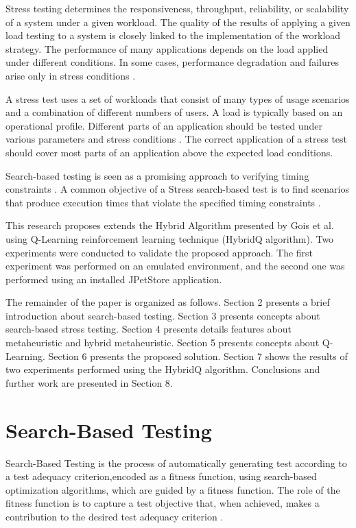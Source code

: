 Stress testing determines the responsiveness, throughput, reliability, or scalability of a system under a given workload. The quality of the results of applying a given load testing to a system is closely linked to the implementation of the workload strategy. The performance of many applications depends on the load applied under different conditions. In some cases, performance degradation and failures arise only in stress conditions \cite{Garousi2010} \cite{Jiang2010}.


A stress test uses a set of workloads that consist of many types of usage scenarios and a combination of different numbers of users. A load is typically based on an operational profile. Different parts of an application should be tested under various parameters and stress conditions \cite{Babbar2011}. The correct application of a stress test should cover most parts of an application above the expected load conditions\cite{Draheim2006b}.

Search-based testing is seen as a promising approach to verifying timing constraints \cite{Afzal2009a}. A common objective of a Stress search-based test is to find  scenarios that produce execution times that violate the specified timing constraints \cite{Sullivan}. 


This research proposes extends the Hybrid Algorithm presented by Gois et al. \cite{Gois2016} using Q-Learning reinforcement learning technique (HybridQ algorithm).  Two experiments were conducted to validate the proposed approach. The first experiment was performed on an emulated environment, and the second one was performed using an installed JPetStore application.

The remainder of the paper is organized as follows. Section 2 presents a brief introduction about search-based testing. Section 3 presents concepts about  search-based stress testing. Section 4 presents details features about metaheuristic and hybrid metaheuristic. Section 5 presents concepts about Q-Learning. Section 6 presents the proposed solution. Section 7 shows the results of two experiments performed using the HybridQ algorithm.  Conclusions and further work are presented in Section 8.



\section{Search-Based Testing}

Search-Based Testing is the process of automatically
generating test according to a test adequacy criterion,encoded as a fitness function, using search-based optimization algorithms, which are guided by a fitness function. The role of the fitness function is to capture a test objective that, when achieved, makes a contribution to the desired test adequacy criterion \cite{Harman2010}. 

